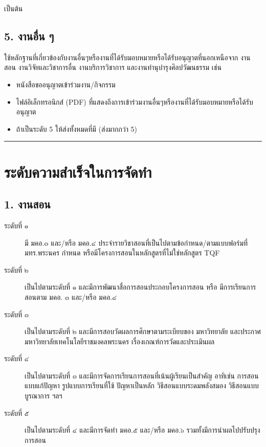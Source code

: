 \documentclass[a4paper,12pt,english]{sphinxmanual}
\begin{document}
เป็นต้น


\subsection{5. งานอื่น ๆ}
\label{\detokenize{submission_part1:id11}}
ใช้หลักฐานที่เกี่ยวข้องกับงานอื่นๆหรืองานที่ได้รับมอบหมายหรือได้รับอนุญาตที่นอกเหนือจาก งานสอน งานวิจัยและวิชาการอื่น งานบริการวิชาการ และงานทำนุบำรุงศิลปวัฒนธรรม เช่น
\begin{itemize}
\item {} 
หนังสือขออนุญาตเข้าร่วมงาน/กิจกรรม

\item {} 
ไฟล์อิเล็กทรอนิกส์ (PDF) ที่แสดงถึงการเข้าร่วมงานอื่นๆหรืองานที่ได้รับมอบหมายหรือได้รับอนุญาต

\item {} 
ถ้าเป็นระดับ 5 ให้ส่งทั้งหมดที่มี (ส่งมากกว่า 5)

\end{itemize}


\bigskip\hrule\bigskip



\section{ระดับความสำเร็จในการจัดทำ}
\label{\detokenize{submission_part1:id12}}

\subsection{1. งานสอน}
\label{\detokenize{submission_part1:id13}}\begin{description}
\item[{ระดับที่ ๑}] \leavevmode
มี มคอ.๓ และ/หรือ มคอ.๔ ประจำรายวิชาสอนที่เป็นไปตามข้อกำหนด/ตามแบบฟอร์มที่ มทร.พระนคร กำหนด หรือมีโครงการสอนในหลักสูตรที่ไม่ใช่หลักสูตร TQF

\item[{ระดับที่ ๒}] \leavevmode
เป็นไปตามระดับที่ ๑ และมีการพัฒนาสื่อการสอนประกอบโครงการสอน หรือ มีการเรียนการสอนตาม มคอ. ๓ และ/หรือ มคอ.๔

\item[{ระดับที่ ๓}] \leavevmode
เป็นไปตามระดับที่ ๒ และมีการสอบวัดผลการศึกษาตามระเบียบของ มหาวิทยาลัย และประกาศมหาวิทยาลัยเทคโนโลยีราชมงคลพระนคร เรื่องเกณฑ์การวัดและประเมินผล

\item[{ระดับที่ ๔}] \leavevmode
เป็นไปตามระดับที่ ๓  และมีการจัดการเรียนการสอนที่เน้นผู้เรียนเป็นสำคัญ อาทิเช่น การสอนแบบแก้ปัญหา รูปแบบการเรียนที่ใช้
ปัญหาเป็นหลัก วิธีสอนแบบระดมพลังสมอง วิธีสอนแบบบูรณาการ ฯลฯ

\item[{ระดับที่ ๕}] \leavevmode
เป็นไปตามระดับที่ ๔ และมีการจัดทำ มคอ.๕ และ/หรือ มคอ.๖ รวมทั้งมีการนำผลไปปรับปรุงการสอน

\end{description}
\end{document}
